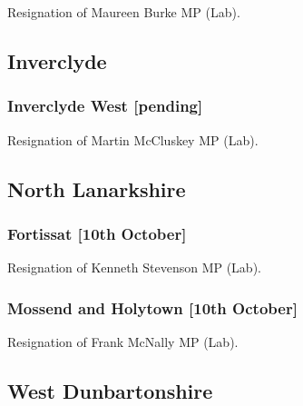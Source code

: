 \documentclass[a4paper,openany]{book}
\begin{document}
\begin{resultsiii}

Resignation of Maureen Burke MP (Lab).

\subsection*{Inverclyde}

\subsubsection*{Inverclyde West \hspace*{\fill}\nolinebreak[1]%
	\enspace\hspace*{\fill}
	[pending]}


Resignation of Martin McCluskey MP (Lab).

\subsection*{North Lanarkshire}

\subsubsection*{Fortissat \hspace*{\fill}\nolinebreak[1]%
	\enspace\hspace*{\fill}
	[10th October]}


Resignation of Kenneth Stevenson MP (Lab).

\subsubsection*{Mossend and Holytown \hspace*{\fill}\nolinebreak[1]%
	\enspace\hspace*{\fill}
	[10th October]}


Resignation of Frank McNally MP (Lab).

\subsection*{West Dunbartonshire}


\end{resultsiii}
\end{document}
